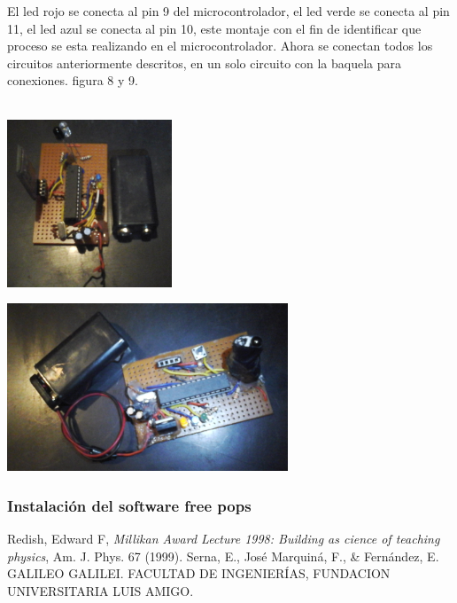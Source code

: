 \documentclass[12pt]{article}
\newenvironment{Figure}
{\par\medskip\noindent\minipage{\linewidth}}
{\endminipage\par\medskip}
\begin{document}
\begin{multicols}{2}
El led rojo se conecta al pin  9 del microcontrolador, el led verde se conecta al pin 11, el led azul se conecta al pin 10, este montaje con el fin de identificar que proceso se esta realizando en el microcontrolador. Ahora se conectan todos los circuitos anteriormente descritos, en un solo circuito con la baquela para conexiones. figura 8 y 9.  
\\ \\
\begin{Figure}
\center
\includegraphics[width=7.cm, height=5cm]{fig/mon0.png}
\label{fig:8}
\end{Figure}
\vspace{0.2cm}

\begin{Figure}
\center
\includegraphics[width=7.cm, height=5cm]{fig/mon1.png}
\label{fig:9}
\end{Figure}
\vspace{0.2cm}

\subsubsection{Instalación del software free pops}
\end{multicols}


\begin{thebibliography}{99}
 Redish, Edward F, \emph{Millikan Award Lecture 1998: Building as cience of teaching physics}, Am. J. Phys. 67 (1999).
 Serna, E., José Marquiná, F., \& Fernández, E. GALILEO GALILEI. FACULTAD DE INGENIERÍAS, FUNDACION UNIVERSITARIA LUIS AMIGO.

\end{thebibliography}
\end{document}
